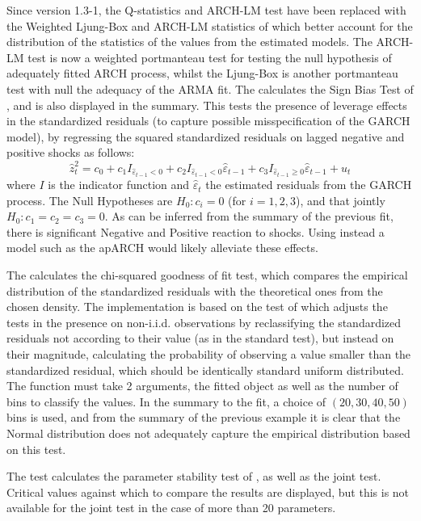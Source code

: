 Since version 1.3-1, the Q-statistics and ARCH-LM test have been replaced with the
Weighted Ljung-Box and ARCH-LM statistics of \cite{Fisher2012a} which better account
for the distribution of the statistics of the values from the estimated models.
The ARCH-LM test is now a weighted portmanteau test for testing the null hypothesis
of adequately fitted ARCH process, whilst the Ljung-Box is another portmanteau test
with null the adequacy of the ARMA fit.
The \verb@signbias@ calculates the Sign Bias Test of \cite{Engle1993}, and is also
displayed in the summary. This tests the presence of leverage effects in the
standardized residuals (to capture possible misspecification of the GARCH model),
by regressing the squared standardized residuals on lagged negative and positive
shocks as follows:
\begin{equation}\label{signbias}
\hat z_t^2 = {c_0} + {c_1}{I_{{{\hat \varepsilon}_{t - 1}} < 0}} +
{c_2}{I_{{{\hat \varepsilon}_{t - 1}} < 0}}{\hat \varepsilon_{t - 1}} + {c_3}{I_{{{\hat \varepsilon}_{t - 1}} \geqslant 0}}{\hat \varepsilon_{t - 1}} + {u_t}
\end{equation}
where $I$ is the indicator function and $\hat \varepsilon_t$ the estimated residuals
from the GARCH process. The Null Hypotheses are $H_0:c_i=0$ (for $i=1,2,3$), and that
jointly $H_0:c_1=c_2=c_3=0$. As can be inferred from the summary of the previous
fit, there is significant Negative and Positive reaction to shocks. Using
instead a model such as the apARCH would likely alleviate these effects.

The \verb@gof@ calculates the chi-squared goodness of fit test, which compares
the empirical distribution of the standardized residuals with the theoretical
ones from the chosen density. The implementation is based on the test of
\cite{Palm1996} which adjusts the tests in the presence on non-i.i.d. observations
by reclassifying the standardized residuals not according to their value (as in
the standard test), but instead on their magnitude, calculating the probability
of observing a value smaller than the standardized residual, which should be
identically standard uniform distributed. The function must take 2 arguments, the
fitted object as well as the number of bins to classify the values. In the
summary to the fit, a choice of $(20,30,40,50)$ bins is used, and from the
summary of the previous example it is clear that the Normal distribution does
not adequately capture the empirical distribution based on this test.

The \verb@nymblom@ test calculates the parameter stability test of \cite{Nyblom1989},
as well as the joint test. Critical values against which to compare the results
are displayed, but this is not available for the joint test in the case of more than 20
parameters.


